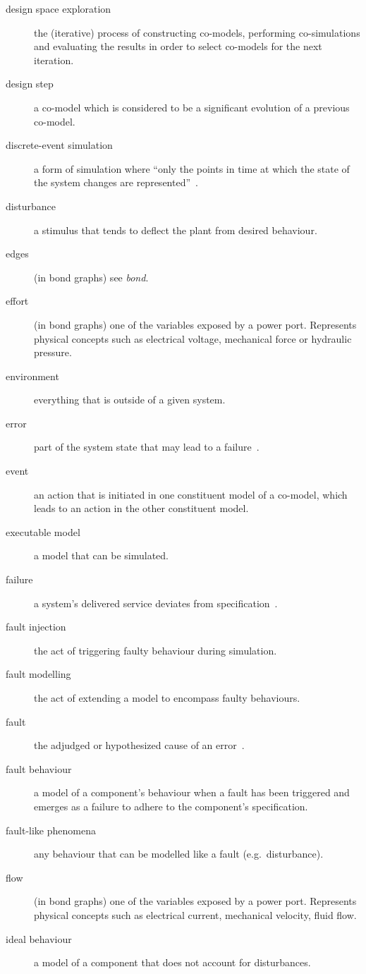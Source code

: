 \documentclass{crescendorepchap}
\begin{document}
\begin{description}
\item[design space exploration] the (iterative) process of constructing co-models, performing co-simulations and evaluating the results in order to select co-models for the next iteration.
\item[design step] a co-model which is considered to be a significant evolution of a previous co-model.
\item[discrete-event simulation] a form of simulation where ``only the points in time at which the state of the system changes are represented''~\cite[p.~15]{Robinson04}.
\item[disturbance] a stimulus that tends to deflect the plant from desired behaviour.
\item[edges] (in bond graphs) see \textit{bond}.
\item[effort] (in bond graphs) one of the variables exposed by a power port.  Represents physical concepts such as electrical voltage, mechanical force or hydraulic pressure.
\item[environment] everything that is outside of a given system.
\item[error] part of the system state that may lead to a failure~\cite{Avizienis&04}.
\item[event] an action that is initiated in one constituent model of a co-model, which leads to an action in the other constituent model.
\item[executable model] a model that can be simulated.
\item[failure] a system's delivered service deviates from specification~\cite{Avizienis&04}.
\item[fault injection] the act of triggering faulty behaviour during simulation.
\item[fault modelling] the act of extending a model to encompass faulty behaviours.
\item[fault] the adjudged or hypothesized cause of an error~\cite{Avizienis&04}.
\item[fault behaviour] a model of a component's behaviour when a fault has been triggered and emerges as a failure to adhere to the component's specification.
\item[fault-like phenomena] any behaviour that can be modelled like a fault (e.g.\ disturbance).
\item[flow] (in bond graphs) one of the variables exposed by a power port.  Represents physical concepts such as electrical current, mechanical velocity, fluid flow.
\item[ideal behaviour] a model of a component that does not account for disturbances.

\end{description}
\end{document}
